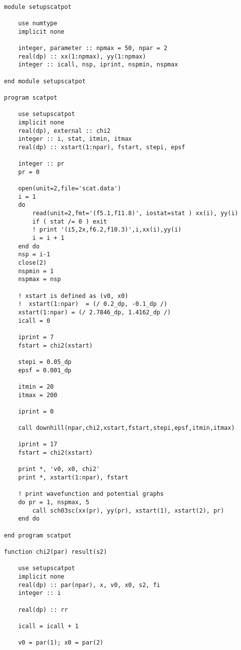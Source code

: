 \documentclass[12pt]{article}
\begin{document}
\begin{lstlisting}[frame=single,caption={{\tt elpot.f90}},label=scatpot2]

module setupscatpot

	use numtype
	implicit none

	integer, parameter :: npmax = 50, npar = 2
	real(dp) :: xx(1:npmax), yy(1:npmax)
	integer :: icall, nsp, iprint, nspmin, nspmax
	
end module setupscatpot

program scatpot

    use setupscatpot
    implicit none
    real(dp), external :: chi2
    integer :: i, stat, itmin, itmax
    real(dp) :: xstart(1:npar), fstart, stepi, epsf

    integer :: pr
    pr = 0

    open(unit=2,file='scat.data')
    i = 1
    do
        read(unit=2,fmt='(f5.1,f11.8)', iostat=stat ) xx(i), yy(i)
        if ( stat /= 0 ) exit
        ! print '(i5,2x,f6.2,f10.3)',i,xx(i),yy(i)
        i = i + 1
    end do
    nsp = i-1
    close(2)
    nspmin = 1
    nspmax = nsp

    ! xstart is defined as (v0, x0)
    !  xstart(1:npar)  = (/ 0.2_dp, -0.1_dp /)
    xstart(1:npar) = (/ 2.7846_dp, 1.4162_dp /)
    icall = 0

    iprint = 7
    fstart = chi2(xstart)

    stepi = 0.05_dp
    epsf = 0.001_dp

    itmin = 20
    itmax = 200

    iprint = 0
    
    call downhill(npar,chi2,xstart,fstart,stepi,epsf,itmin,itmax)
 
    iprint = 17
    fstart = chi2(xstart)

    print *, 'v0, x0, chi2'
    print *, xstart(1:npar), fstart

    ! print wavefunction and potential graphs
    do pr = 1, nspmax, 5
        call sch03sc(xx(pr), yy(pr), xstart(1), xstart(2), pr)
    end do
    
end program scatpot

function chi2(par) result(s2)

    use setupscatpot
    implicit none
    real(dp) :: par(npar), x, v0, x0, s2, fi 
    integer :: i 

    real(dp) :: rr

    icall = icall + 1

    v0 = par(1); x0 = par(2)


\end{lstlisting}
\end{document}
